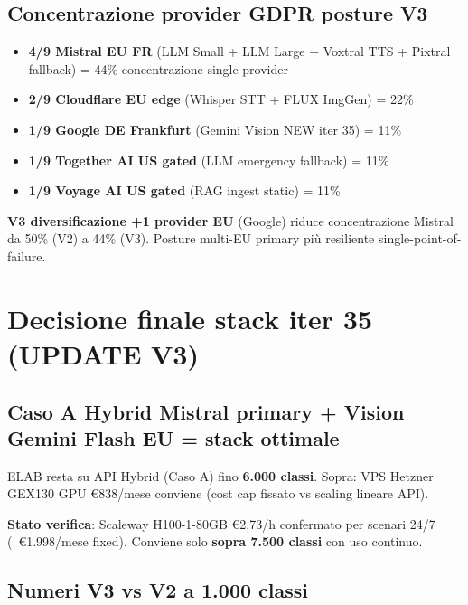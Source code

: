 \documentclass[12pt,a4paper]{article}
\begin{document}
\subsection*{Concentrazione provider GDPR posture V3}

\begin{itemize}[leftmargin=*]
  \item \textbf{4/9 Mistral EU FR} (LLM Small + LLM Large + Voxtral TTS + Pixtral fallback) = 44\% concentrazione single-provider
  \item \textbf{2/9 Cloudflare EU edge} (Whisper STT + FLUX ImgGen) = 22\%
  \item \textbf{1/9 Google DE Frankfurt} (Gemini Vision NEW iter 35) = 11\%
  \item \textbf{1/9 Together AI US gated} (LLM emergency fallback) = 11\%
  \item \textbf{1/9 Voyage AI US gated} (RAG ingest static) = 11\%
\end{itemize}

\textbf{V3 diversificazione +1 provider EU} (Google) riduce concentrazione Mistral da 50\% (V2) a 44\% (V3). Posture multi-EU primary più resiliente single-point-of-failure.

\section{Decisione finale stack iter 35 (UPDATE V3)}

\subsection*{Caso A Hybrid Mistral primary + Vision Gemini Flash EU = stack ottimale}

ELAB resta su API Hybrid (Caso A) fino \textbf{6.000 classi}. Sopra: VPS Hetzner GEX130 GPU €838/mese conviene (cost cap fissato vs scaling lineare API).

\textbf{Stato verifica}: Scaleway H100-1-80GB \euro 2,73/h confermato per scenari 24/7 (~\euro 1.998/mese fixed). Conviene solo \textbf{sopra 7.500 classi} con uso continuo.

\subsection*{Numeri V3 vs V2 a 1.000 classi}
\end{document}
